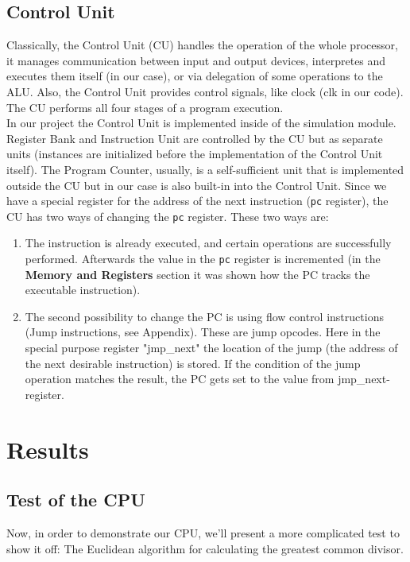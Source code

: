 \documentclass[12pt,a4paper]{scrartcl}
\begin{document}
\subsection{Control Unit}
Classically, the Control Unit (CU) handles the operation of the whole processor, it manages communication between input and output devices, interpretes and executes them itself (in our case), or via delegation of some operations to the ALU. Also, the Control Unit provides control signals, like clock (clk in our code). The CU performs all four stages of a program execution.\\
In our project the Control Unit is implemented inside of the simulation module. Register Bank and Instruction Unit are controlled by the CU but as separate units (instances are initialized before the implementation of the Control Unit itself). The Program Counter, usually, is a self-sufficient unit that is implemented outside the CU but in our case is also built-in into the Control Unit. Since we have a special register for the address of the next instruction (\texttt{pc} register), the CU has two ways of changing the \texttt{pc} register. These two ways are:
\begin{enumerate}
	\item The instruction is already executed, and certain operations are successfully performed. Afterwards the value in the \texttt{pc} register is  incremented (in the \textbf{Memory and Registers} section it was shown how the PC tracks the executable instruction). 
	\item The second possibility to change the PC is using flow control instructions (Jump instructions, see Appendix). These are jump opcodes. Here in the special purpose register "jmp\_next" the location of the jump (the address of the next desirable instruction) is stored. If the condition of the jump operation matches the result, the PC gets set to the value from jmp\_next-register.
\end{enumerate}

\newpage
\section{Results}
\subsection{Test of the CPU}
Now, in order to demonstrate our CPU, we'll present a more complicated test to show it off: The Euclidean algorithm for calculating the greatest common divisor.
\end{document}
